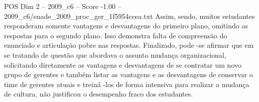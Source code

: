 \begin{textsample}{POS Dim 2 – 2009\_c6 – Score -1.00 – 2009\_c6/enade\_2009\_proc\_ger\_1f5954ceea.txt}
Assim, sendo, muitos estudantes responderam somente vantagens e desvantagens do primeiro plano, omitindo as respostas para o segundo plano.
Isso demonstra falta de compreensão do enunciado e articulação pobre nas respostas.
Finalizado, pode -se afirmar que em se tratando de questão que abordava o assunto mudança organizacional, solicitando diretamente as vantagens e desvantagens de se contratar um novo grupo de gerentes e também listar as vantagens e as desvantagens de conservar o time de gerentes atuais e treiná -los de forma intensiva para realizar a mudança de cultura, não justificou o desempenho fraco dos estudantes.

\end{textsample}
